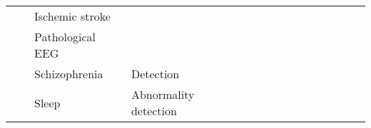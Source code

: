 \begin{tabular}{p{1.5cm}p{1.5cm}p{1.5cm}p{1.5cm}p{0.6cm}p{0.6cm}p{0.6cm}p{0.6cm}p{0.6cm}p{0.6cm}p{0.6cm}p{0.6cm}p{0.6cm}p{0.6cm}p{0.6cm}}
                                &                 & Ischemic stroke &   &                                                             &                                                                                                            \cite{Giri2016a} &                                                                        &                                      &                                                            &                      &                         &                               &                     &                         &                                                                      \\
                                &                 & Pathological EEG &   &                                                             &                                                                                                   \cite{Schirrmeister2017a} &                                                         \cite{Roy2018} &                                      &                                                            &                      &                         &                               &                     &                         &                                                                      \\
                                &                 & Schizophrenia & Detection &                                                             &                                                                                                              \cite{Chu2017} &                                                                        &                                      &                                                            &                      &                         &                               &                     &                         &                                                                      \\
                                &                 & Sleep & Abnormality detection &                                                             &                                                                                                         \cite{Ruffini2018a} &                                                                        &                                      &                                                            &                      &                         &                               &                     &                         &                                                                      \\

\end{tabular}
